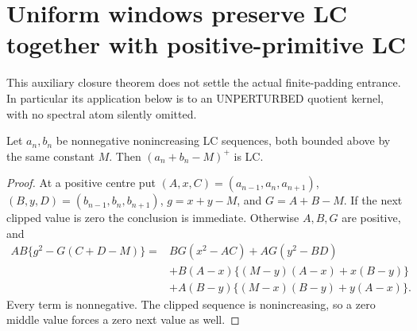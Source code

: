 \section{Uniform windows preserve LC together with positive-primitive LC}
This auxiliary closure theorem does not settle the actual finite-padding
entrance. In particular its application below is to an UNPERTURBED
quotient kernel, with no spectral atom silently omitted.

\begin{lemma}
Let $a_n,b_n$ be nonnegative nonincreasing LC sequences, both bounded
above by the same constant $M$. Then $(a_n+b_n-M)^+$ is LC.
\end{lemma}
\begin{proof}
At a positive centre put $(A,x,C)=(a_{n-1},a_n,a_{n+1})$,
$(B,y,D)=(b_{n-1},b_n,b_{n+1})$, $g=x+y-M$, and
$G=A+B-M$. If the next clipped value is zero the conclusion is
immediate. Otherwise $A,B,G$ are positive, and
\[
\begin{aligned}
 AB\{g^2-G(C+D-M)\}
={}&BG(x^2-AC)+AG(y^2-BD)\\
 &+B(A-x)\{(M-y)(A-x)+x(B-y)\}\\
 &+A(B-y)\{(M-x)(B-y)+y(A-x)\}.
\end{aligned}
\]
Every term is nonnegative. The clipped sequence is nonincreasing,
so a zero middle value forces a zero next value as well.
\end{proof}

